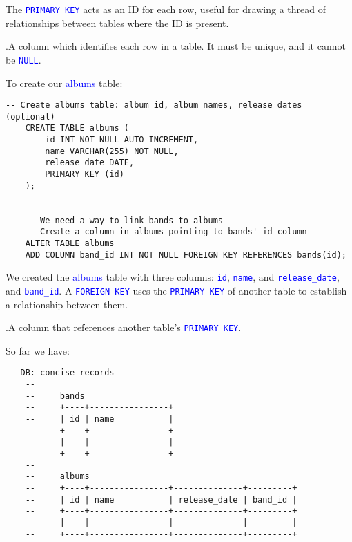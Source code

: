 \newpage

\noindent
The \textcolor{blue}{\texttt{PRIMARY KEY}} acts as an ID for each row, useful for
drawing a thread of relationships between tables where the ID is present.\\

\begin{Def}
    .A column which identifies each row in a table. It must be unique, and it cannot be \textcolor{blue}{\texttt{NULL}}.
\end{Def}

\noindent
To create our \textcolor{blue}{albums} table:

\begin{lstlisting}[style=sql]
    -- Create albums table: album id, album names, release dates (optional)
    CREATE TABLE albums (
        id INT NOT NULL AUTO_INCREMENT,
        name VARCHAR(255) NOT NULL,
        release_date DATE,
        PRIMARY KEY (id)
    );


    -- We need a way to link bands to albums
    -- Create a column in albums pointing to bands' id column
    ALTER TABLE albums
    ADD COLUMN band_id INT NOT NULL FOREIGN KEY REFERENCES bands(id);

\end{lstlisting}

\vspace{1em}
\noindent
We created the \textcolor{blue}{albums} table with three columns: \textcolor{blue}{\texttt{id}}, \textcolor{blue}{\texttt{name}}, and \textcolor{blue}{\texttt{release\_date}},
and \textcolor{blue}{\texttt{band\_id}}. A \textcolor{blue}{\texttt{FOREIGN KEY}} uses the \textcolor{blue}{\texttt{PRIMARY KEY}} of another table to establish a relationship between them.\\

\begin{Def}
    .A column that references another table's \textcolor{blue}{\texttt{PRIMARY KEY}}.
\end{Def}

\noindent
So far we have:
\begin{lstlisting}[style=sql]
    -- DB: concise_records
    --
    --     bands
    --     +----+----------------+
    --     | id | name           |
    --     +----+----------------+
    --     |    |                |
    --     +----+----------------+
    --
    --     albums
    --     +----+----------------+--------------+---------+
    --     | id | name           | release_date | band_id |
    --     +----+----------------+--------------+---------+
    --     |    |                |              |         |
    --     +----+----------------+--------------+---------+
\end{lstlisting}

